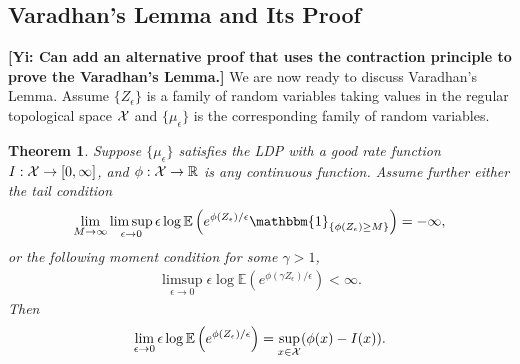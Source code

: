 \documentclass[10pt]{article}
\def\X{{\cal X}}
\newcommand{\e}{\mathbb{E}}
\newcommand{\gy}[1]{\textbf{\color{red}[Yi: #1]}}
\newtheorem{theorem}{\bf Theorem}
\newenvironment{Proof of lemma}{\noindent{\bf Proof of Lemma}}{\hfill$\Box$\newline}
\newenvironment{Proof of claim}{\noindent{\bf Proof of claim}}{\hfill$\Box$\newline}
\newenvironment{Proof of theorem}{\noindent{\bf Proof of Theorem}}{\hfill\scriptsize{$\Box$}\newline}
\newenvironment{Proof of theorems}{\noindent{\bf Proof of Theorems}}{\hfill$\Box$\newline}
\newenvironment{Proof of proposition}{\noindent{\bf Proof of Proposition}}{\hfill$\Box$\newline}
\newenvironment{Proof of propositions}{\noindent{\bf Proof of Propositions}}{\hfill$\Box$\newline}
\newenvironment{Proof of exercise}{\noindent{\it Proof of Exercise:}}{\hfill$\Box$}
\numberwithin{equation}{section}
\begin{document}
\subsection{Varadhan's Lemma and Its Proof}
\gy{Can add an alternative proof that uses the contraction principle to prove the Varadhan's Lemma.}
We are now ready to discuss Varadhan's Lemma. Assume $\{Z_{\epsilon}\}$ is a family of random variables taking values in the regular topological space $\X$ and $\{\mu_{\epsilon}\}$ is the corresponding family of random variables.
\begin{theorem}
    Suppose $\{\mu_{\epsilon}\}$ satisfies the LDP with a good rate function $I: \X \to [0,\infty]$, and $\phi: \X \to \mathbb{R}$ is any continuous function. Assume further either the tail condition
    \begin{align} \label{vara_tail_cond}
        \lim_{M \to \infty} \limsup_{\epsilon \to 0} \epsilon \log \e \left(e^{\phi(Z_{\epsilon})/\epsilon}\mathbbm{1}_{\{\phi(Z_{\epsilon}) \geq M\}}\right) = -\infty,
    \end{align}
    or the following moment condition for some $\gamma >1$,
    \begin{align} \label{vara_moment_cond}
        \limsup_{\epsilon \to 0}\epsilon \log \e \left(e^{\phi(\gamma Z_{\epsilon})/\epsilon}\right) < \infty.
    \end{align}
    Then
    \begin{align}
        \lim_{\epsilon \to 0} \epsilon \log \e \left(e^{\phi(Z_{\epsilon})/\epsilon}\right) = \sup_{x \in \X}(\phi(x)-I(x)).
    \end{align}
\end{theorem}
\end{document}
